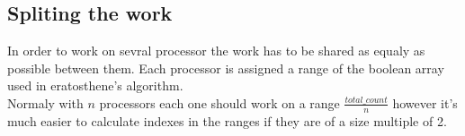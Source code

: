 \subsection{Spliting the work}

In order to work on sevral processor the work has to be shared as equaly as possible between them. Each processor is assigned a range of the boolean array used in eratosthene's algorithm.\\Normaly with $n$ processors each one should work on a range $\frac{total\_count}{n}$ however it's much easier to calculate indexes in the ranges if they are of a size multiple of 2. 



